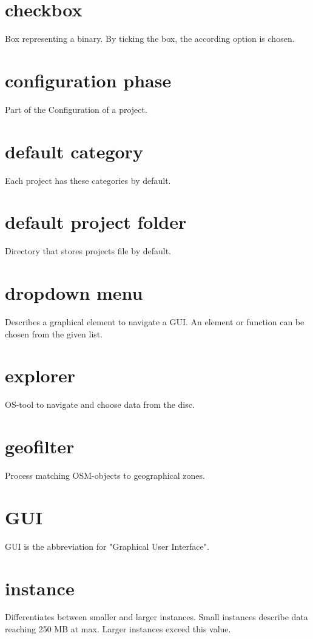 \documentclass[letterpaper,10pt,english]{sphinxmanual}
\begin{document}
\section*{checkbox}
Box representing a binary. By ticking the box, the according option is chosen.

\section*{configuration phase}
Part of the Configuration of a project.

\section*{default category}
Each project has these categories by default.

\section*{default project folder}
Directory that stores projects file by default.

\section*{dropdown menu}
Describes a graphical element to navigate a GUI. An element or function can be chosen from the given list.

\section*{explorer}
OS-tool to navigate and choose data from the disc.

\section*{geofilter}
Process matching OSM-objects to geographical zones.

\section*{GUI}
GUI is the abbreviation for "Graphical User Interface".

\section*{instance}
Differentiates between smaller and larger instances. Small instances describe data reaching 250 MB at max. Larger instances exceed this value.
\end{document}
